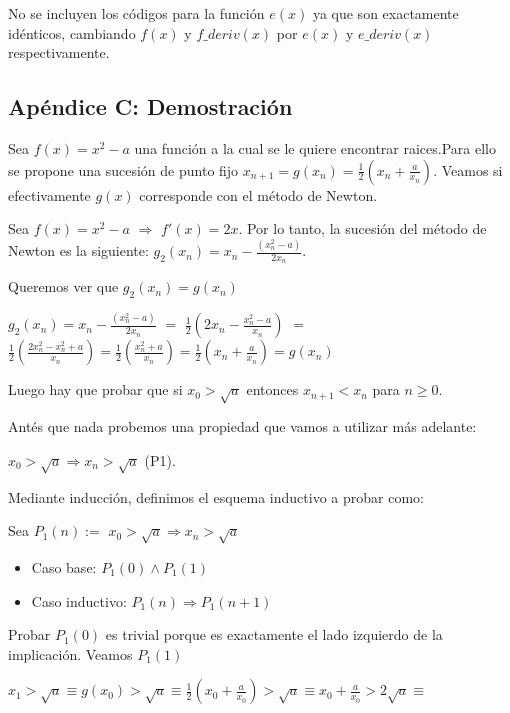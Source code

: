 No se incluyen los c\'odigos para la funci\'on $e(x)$ ya que son exactamente id\'enticos, cambiando $f(x)$ y $f\_deriv(x)$ por $e(x)$ y $e\_deriv(x)$ respectivamente.


\subsection{Apéndice C: Demostración}

Sea $f(x) = x^2 -a$ una funci\'on a la cual se le quiere encontrar raices.Para ello se propone una sucesi\'on de punto fijo $x_{n+1} = g(x_n) = \frac{1}{2}\left(x_n+ \frac{a}{x_n}\right)$. Veamos si efectivamente $g(x)$ corresponde con el m\'etodo de Newton.

Sea $f(x) = x^2 - a$ $\Rightarrow$ $f'(x) = 2x$. Por lo tanto, la sucesi\'on del m\'etodo de Newton es la siguiente: $g_{2}(x_n) = x_n - \frac{(x_{n}^2 -a)}{2x_n}$. 

Queremos ver que $g_2(x_n)=g(x_n)$ 

$\displaystyle g_{2}(x_n) = \displaystyle x_n - \frac{(x_{n}^2 -a)}{2x_n}$ $=$ $\displaystyle \frac{1}{2}\left(2x_n - \frac{x_{n}^2 - a}{x_n}\right)$ $=$ $\displaystyle \frac{1}{2}\left(\frac{2x_{n}^2 -x_{n}^2 + a}{x_n}\right) = \frac{1}{2}\left(\frac{x_{n}^2 + a}{x_n}\right) = \frac{1}{2}\left(x_{n} + \frac{a}{x_n}\right) = g(x_n)$

Luego hay que probar que si $x_0 > \sqrt{a}$ entonces $x_{n+1} < x_n$ para $n \geq 0$.

Ant\'es que nada probemos una propiedad que vamos a utilizar m\'as adelante:

\hspace{6.5cm}$x_0 > \sqrt{a} \Rightarrow x_n > \sqrt{a}$ (P1). 

Mediante inducci\'on, definimos el esquema inductivo a probar como:

Sea $P_1(n):=$ $x_0 > \sqrt{a} \Rightarrow x_n > \sqrt{a} $
\begin{itemize}
	\item Caso base: $P_1(0) \land P_1(1)$ 
	\item Caso inductivo: $P_1(n) \Rightarrow P_1(n+1)$
\end{itemize}

Probar $P_1(0)$ es trivial porque es exactamente el lado izquierdo de la implicaci\'on. Veamos $P_1(1)$

\hspace{4cm}$\displaystyle  x_1 > \sqrt{a} \equiv g(x_0) > \sqrt{a} \equiv \frac{1}{2}\left(x_0+ \frac{a}{x_0}\right) > \sqrt{a} \equiv x_0+ \frac{a}{x_0} > 2\sqrt{a}\equiv$


